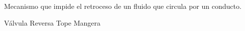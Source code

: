
\question Mecanismo que impide el retroceso de un fluido que circula
  por un conducto.

  \begin{oneparchoices}
    \CorrectChoice Válvula
    \choice Reversa
    \choice Tope
    \choice Mangera
  \end{oneparchoices}
  \answerline[A]
